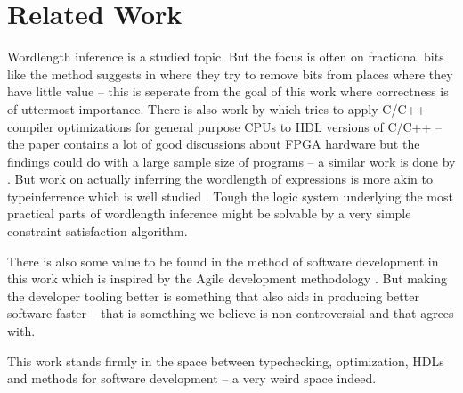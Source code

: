 \chapter{Related Work}
Wordlength inference is a studied topic. But the focus is often on fractional bits like the method \citeauthor{src:MinOfFrac} suggests in \cite{src:MinOfFrac} where they try to remove bits from places where they have little value -- this is seperate from the goal of this work where correctness is of uttermost importance. There is also work \cite{src:HLSandOpt} by \citeauthor{src:HLSandOpt} which tries to apply C/C++ compiler optimizations for general purpose CPUs to HDL versions of C/C++ -- the paper contains a lot of good discussions about FPGA hardware but the findings could do with a large sample size of programs -- a similar work is done by \citeauthor{src:ConFPGA}. But work on actually inferring the wordlength of expressions is more akin to typeinferrence which is well studied \cite{src:DamasHindleyMilner}\cite{src:TypeCheckersBook}\cite{src:BiTy}. Tough the logic system underlying the most practical parts of wordlength inference might be solvable by a very simple constraint satisfaction algorithm.

There is also some value to be found in the method of software development in this work which is inspired by the Agile development methodology \cite{src:Agile}. But making the developer tooling better is something that also aids in producing better software faster -- that is something we believe is non-controversial and that \cite{src:Agile} agrees with.

This work stands firmly in the space between typechecking, optimization, HDLs and methods for software development -- a very weird space indeed.
